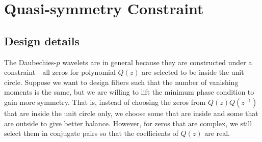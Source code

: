 \chapter{Quasi-symmetry Constraint}
\label{chp:symlets}
\section{Design details}
The Daubechies-$p$ wavelets  are in general  because they are constructed
under a  constraint---all zeros for polynomial $Q(z)$
are selected to be inside the unit circle.
Suppose we want to design filters such that the number of
vanishing moments is the same, but we are willing
to lift the minimum phase condition to gain more symmetry.
That is, instead of choosing the zeros from $Q(z)Q(z^{-1})$ that are
inside the unit circle only, we choose some that are inside and some that
are outside to give better balance.
However, for zeros that are complex, we still select them
in conjugate pairs so that the coefficients of $Q(z)$ are real.


